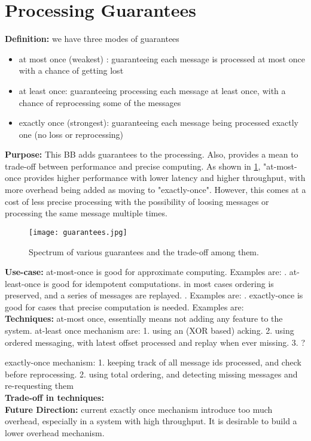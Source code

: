\section{Processing Guarantees}

	\noindent\textbf{Definition:} we have three modes of guarantees 
	\begin{itemize}
		\item at most once (weakest) : guaranteeing each message is processed at most once with a chance of getting lost
		\item at least once: guaranteeing processing each message at least once, with a chance of reprocessing some of the messages
		\item exactly once (strongest): guaranteeing each message being processed exactly one (no loss or reprocessing)
	\end{itemize}	 

	\noindent \textbf{Purpose:} This BB adds guarantees to the processing. Also, provides a mean to trade-off between performance and precise computing. As shown in \ref{fig:guarantees}, "at-most-once provides higher performance with lower latency and higher throughput, with more overhead being added as moving to "exactly-once". However, this comes at a cost of less precise processing with the possibility of loosing messages or processing the same message multiple times.
	
	\begin{figure}[h]
		\centering
		\texttt{[image: guarantees.jpg]}
		\caption{Spectrum of various guarantees and the trade-off among them. }
		\label{fig:guarantees}
	\end{figure}
	
	
	\noindent \textbf{Use-case:} at-most-once is good for approximate computing. Examples are: . at-least-once is good for idempotent computations. in most cases ordering is preserved, and a series of messages are replayed. . Examples are: .  exactly-once is good for cases that precise computation is needed. Examples are: \\
	

\noindent \textbf{Techniques:} at-most once, essentially means not adding any feature to the system. at-least once mechanism are: 1. using an (XOR based) acking. 2. using ordered messaging, with latest offset processed and replay when ever missing. 3. ?

exactly-once mechanism: 1. keeping track of all message ids processed, and check before reprocessing. 2. using total ordering, and detecting missing messages and re-requesting them 
\\

\noindent \textbf{Trade-off in techniques: }  \\

\noindent \textbf{Future Direction:} current exactly once mechanism introduce too much overhead, especially in a system with high throughput. It is desirable to build a lower overhead mechanism. 






